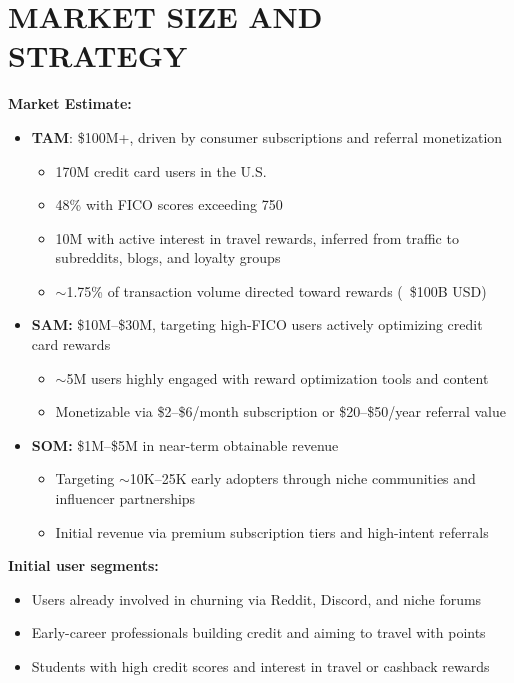 \section{MARKET SIZE AND STRATEGY}
\textbf{Market Estimate:}
\vspace{-0.5em}
\begin{itemize}[noitemsep]
    \item \textbf{TAM}: \$100M+, driven by consumer subscriptions and referral monetization
    \begin{itemize}
        \item 170M credit card users in the U.S.
        \item 48\% with FICO scores exceeding 750
        \item 10M with active interest in travel rewards, inferred from traffic to subreddits, blogs, and loyalty groups
        \item $\sim$1.75\% of transaction volume directed toward rewards (~\$100B USD)
    \end{itemize}
    
    \item \textbf{SAM:} \$10M--\$30M, targeting high-FICO users actively optimizing credit card rewards
    \begin{itemize}
        \item $\sim$5M users highly engaged with reward optimization tools and content
        \item Monetizable via \$2--\$6/month subscription or \$20--\$50/year referral value
    \end{itemize}
    
    \item \textbf{SOM:} \$1M--\$5M in near-term obtainable revenue
    \begin{itemize}
        \item Targeting $\sim$10K--25K early adopters through niche communities and influencer partnerships
        \item Initial revenue via premium subscription tiers and high-intent referrals
    \end{itemize}
\end{itemize}
\vspace{-0.5em}

\textbf{Initial user segments:}
\vspace{-0.5em}
\begin{itemize}[noitemsep]
\item Users already involved in churning via Reddit, Discord, and niche forums
\item Early-career professionals building credit and aiming to travel with points
\item Students with high credit scores and interest in travel or cashback rewards
\end{itemize}
\vspace{-0.5em}

